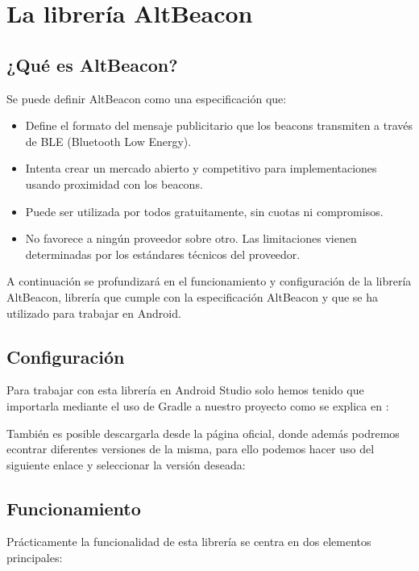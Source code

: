 \section{La librería AltBeacon}


\subsection{¿Qué es AltBeacon?}

Se puede definir AltBeacon como una especificación que: 

\begin{itemize}
\item Define el formato del mensaje publicitario que los beacons transmiten a través de BLE (Bluetooth Low Energy).
\item Intenta crear un mercado abierto y competitivo para implementaciones usando proximidad con los beacons.
\item Puede ser utilizada por todos gratuitamente, sin cuotas ni compromisos.
\item No favorece a ningún proveedor sobre otro. Las limitaciones vienen determinadas por los estándares técnicos del proveedor.
\end{itemize}

A continuación se profundizará en el funcionamiento y configuración de la librería AltBeacon, librería que cumple con la especificación AltBeacon y que se ha utilizado para trabajar en Android.

\subsection{Configuración}

Para trabajar con esta librería en Android Studio solo hemos tenido que importarla mediante el uso de Gradle a nuestro proyecto como se explica en : \cite{URL::importGradle}


También es posible descargarla desde la página oficial, donde además podremos econtrar diferentes versiones de la misma, para ello podemos hacer uso del siguiente enlace y seleccionar la versión deseada:  \cite{URL::versionAltBeacon}


\subsection{Funcionamiento}

Prácticamente la funcionalidad de esta librería se centra en dos elementos principales: 

